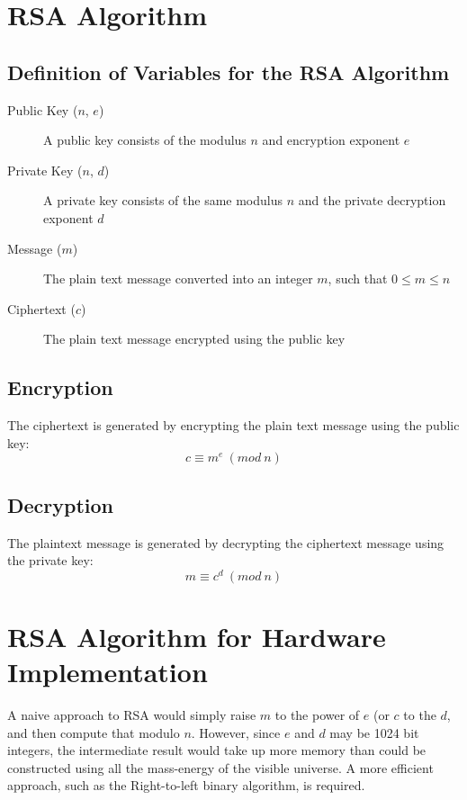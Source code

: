 \documentclass[a4paper,11pt]{report}
\begin{document}
\section{RSA Algorithm}
\subsection{Definition of Variables for the RSA Algorithm}
\begin{description}
\item[Public Key ($n$, $e$)] A public key consists of the modulus $n$ and encryption exponent $e$
\item[Private Key ($n$, $d$)]A  private key consists of the same modulus $n$ and the private decryption exponent $d$
\item[Message ($m$)] The plain text message converted into an integer $m$, such that $0 \leq m \leq n$ 
\item[Ciphertext ($c$)]  The plain text message encrypted using the public key
\end{description}
\subsection{Encryption}
The ciphertext is generated by encrypting the plain text message using the public key:
\begin{equation}
  c \equiv m^e\ (mod\ n)
\end{equation}
\subsection{Decryption}
The plaintext message is generated by decrypting the ciphertext message using the private key:
\begin{equation}
  m \equiv c^d\ (mod\ n)
\end{equation}
\section{RSA Algorithm for Hardware Implementation}
A naive approach to RSA would simply raise $m$ to the power of $e$ (or $c$ to the $d$, and then compute that modulo $n$.
However, since $e$ and $d$ may be 1024 bit integers, the intermediate result would take up more memory than could be constructed
using all the mass-energy of the visible universe.
A more efficient approach, such as the Right-to-left binary algorithm, is required.
\end{document}
